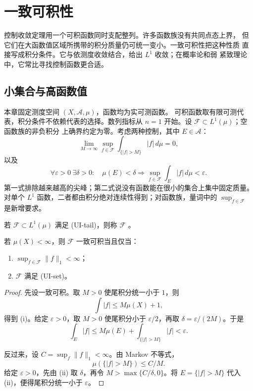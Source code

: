 \chapter{一致可积性}
\label{chap:uniform-integrability}

控制收敛定理用一个可积函数同时支配整列。许多函数族没有共同点态上界，
但它们在大函数值区域所携带的积分质量仍可统一变小。一致可积性把这种性质
直接写成积分条件。它与依测度收敛结合，给出 \(L^1\) 收敛；在概率论和弱
紧致理论中，它常比寻找控制函数更合适。

\section{小集合与高函数值}

本章固定测度空间 \((X,\mathcal A,\mu)\)，函数均为实可测函数。
可积函数取有限可测代表，积分条件不依赖代表的选择。数列指标从
\(n=1\) 开始。设 \(\mathcal F\subset L^1(\mu)\)；空函数族的非负积分
上确界约定为零。考虑两种控制，其中 \(E\in\mathcal A\)：
\[
\tag{UI-tail}
\lim_{M\to\infty}\sup_{f\in\mathcal F}
\int_{\{|f|>M\}}|f|\,d\mu=0,
\]
以及
\[
\tag{UI-set}
\forall\varepsilon>0\ \exists\delta>0:\quad
\mu(E)<\delta\Longrightarrow
\sup_{f\in\mathcal F}\int_E|f|\,d\mu<\varepsilon.
\]
第一式排除越来越高的尖峰；第二式说没有函数能在很小的集合上集中固定质量。
对单个 \(L^1\) 函数，二者都由积分绝对连续性得到；对函数族，量词中的
\(\sup_{f\in\mathcal F}\) 是新增要求。

\begin{definition}
若 \(\mathcal F\subset L^1(\mu)\) 满足 \textup{(UI-tail)}，则称
\(\mathcal F\) 。
\end{definition}

\begin{proposition}[有限测度空间上的判据]
\label{prop:ui-finite-measure-criterion}
若 \(\mu(X)<\infty\)，则 \(\mathcal F\) 一致可积当且仅当：
\begin{enumerate}[label=\textup{(\roman*)}]
 \item \(\sup_{f\in\mathcal F}\|f\|_1<\infty\)；
 \item \(\mathcal F\) 满足 \textup{(UI-set)}。
\end{enumerate}
\end{proposition}

\begin{proof}
先设一致可积。取 \(M>0\) 使尾积分统一小于 \(1\)，则
\[
 \int|f|\le M\mu(X)+1,
\]
得到 (i)。给定 \(\varepsilon>0\)，取 \(M>0\) 使尾积分小于
\(\varepsilon/2\)，再取 \(\delta=\varepsilon/(2M)\)。于是
\[
 \int_E|f|
 \le M\mu(E)+\int_{\{|f|>M\}}|f|<\varepsilon.
\]

反过来，设 \(C=\sup_f\|f\|_1<\infty\)。由 Markov 不等式，
\[
 \mu(\{|f|>M\})\le C/M.
\]
给定 \(\varepsilon>0\)，先由 (ii) 取 \(\delta\)，再令
\(M>\max\{C/\delta,0\}\)。将 \(E=\{|f|>M\}\) 代入 (ii)，便得尾积分统一小于
\(\varepsilon\)。
\end{proof}

